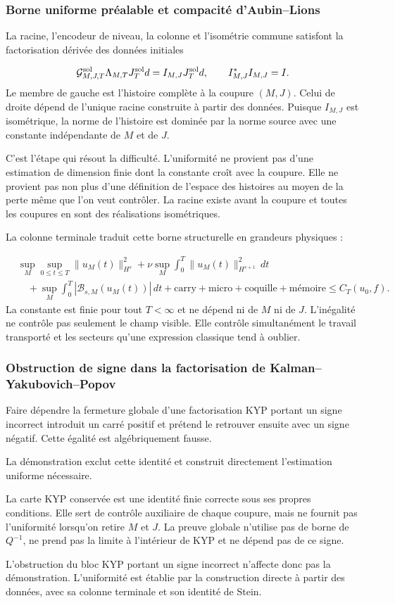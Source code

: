 \subsubsection{Borne uniforme préalable et compacité d’Aubin–Lions}
La racine, l’encodeur de niveau, la colonne et l’isométrie commune satisfont la factorisation dérivée des données initiales\par
\[
\mathcal G_{M,J,T}^{\rm sol}
\Lambda_{M,T}
J_T^{\rm sol}d
=
I_{M,J}J_T^{\rm sol}d,
\qquad
I_{M,J}^{*}I_{M,J}=I.
\]
Le membre de gauche est l’histoire complète à la coupure \((M,J)\). Celui de droite dépend de l’unique racine construite à partir des données. Puisque \(I_{M,J}\) est isométrique, la norme de l’histoire est dominée par la norme source avec une constante indépendante de \(M\) et de \(J\).\par
C’est l’étape qui résout la difficulté. L’uniformité ne provient pas d’une estimation de dimension finie dont la constante croît avec la coupure. Elle ne provient pas non plus d’une définition de l’espace des histoires au moyen de la perte même que l’on veut contrôler. La racine existe avant la coupure et toutes les coupures en sont des réalisations isométriques.\par
La colonne terminale traduit cette borne structurelle en grandeurs physiques :\par
\[
\begin{aligned}
&\sup_M\sup_{0\le t\le T}\|u_M(t)\|_{H^s}^2
+\nu\sup_M\int_0^T\|u_M(t)\|_{H^{s+1}}^2\,dt\\
&\quad
+\sup_M\int_0^T|\mathscr B_{s,M}(u_M(t))|\,dt
+\text{carry}+\text{micro}+\text{coquille}+\text{mémoire}
\le C_T(u_0,f).
\end{aligned}
\]
La constante est finie pour tout \(T<\infty\) et ne dépend ni de \(M\) ni de \(J\). L’inégalité ne contrôle pas seulement le champ visible. Elle contrôle simultanément le travail transporté et les secteurs qu’une expression classique tend à oublier.\par
{}
\subsubsection{Obstruction de signe dans la factorisation de Kalman–Yakubovich–Popov}
Faire dépendre la fermeture globale d’une factorisation KYP portant un signe incorrect introduit un carré positif et prétend le retrouver ensuite avec un signe négatif. Cette égalité est algébriquement fausse.\par
La démonstration exclut cette identité et construit directement l’estimation uniforme nécessaire.\par
La carte KYP conservée est une identité finie correcte sous ses propres conditions. Elle sert de contrôle auxiliaire de chaque coupure, mais ne fournit pas l’uniformité lorsqu’on retire \(M\) et \(J\). La preuve globale n’utilise pas de borne de \(Q^{-1}\), ne prend pas la limite à l’intérieur de KYP et ne dépend pas de ce signe.\par
L’obstruction du bloc KYP portant un signe incorrect n’affecte donc pas la démonstration. L’uniformité est établie par la construction directe à partir des données, avec sa colonne terminale et son identité de Stein.\par
{}
